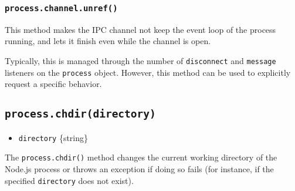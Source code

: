 \subsubsection{\texorpdfstring{\texttt{process.channel.unref()}}{process.channel.unref()}}\label{process.channel.unref}

This method makes the IPC channel not keep the event loop of the process
running, and lets it finish even while the channel is open.

Typically, this is managed through the number of
\texttt{\textquotesingle{}disconnect\textquotesingle{}} and
\texttt{\textquotesingle{}message\textquotesingle{}} listeners on the
\texttt{process} object. However, this method can be used to explicitly
request a specific behavior.

\subsection{\texorpdfstring{\texttt{process.chdir(directory)}}{process.chdir(directory)}}\label{process.chdirdirectory}

\begin{itemize}
\tightlist
\item
  \texttt{directory} \{string\}
\end{itemize}

The \texttt{process.chdir()} method changes the current working
directory of the Node.js process or throws an exception if doing so
fails (for instance, if the specified \texttt{directory} does not
exist).

\begin{Shaded}
\begin{Highlighting}[]
\OperatorTok{,} \OperatorTok{;}

\NormalTok{(}\SpecialCharTok{$\{}\NormalTok{()}\SpecialCharTok{\}}\VerbatimStringTok{\textasciigrave{}}\NormalTok{)}\OperatorTok{;}
\NormalTok{ \{}
  \NormalTok{(}\NormalTok{)}\OperatorTok{;}
  \NormalTok{(}\SpecialCharTok{$\{}\NormalTok{()}\SpecialCharTok{\}}\VerbatimStringTok{\textasciigrave{}}\NormalTok{)}\OperatorTok{;}
\NormalTok{\} }
  \NormalTok{(}\SpecialCharTok{$\{}\SpecialCharTok{\}}\VerbatimStringTok{\textasciigrave{}}\NormalTok{)}\OperatorTok{;}
\NormalTok{\}}
\end{Highlighting}
\end{Shaded}

